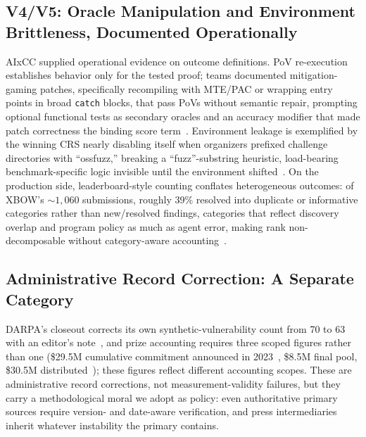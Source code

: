 \documentclass[conference,compsoc]{IEEEtran}
\begin{document}
\subsection{V4/V5: Oracle Manipulation and Environment Brittleness, Documented Operationally}
AIxCC supplied operational evidence on outcome definitions. PoV re-execution establishes
behavior only for the tested proof; teams documented mitigation-gaming patches, specifically recompiling
with MTE/PAC or wrapping entry points in broad \texttt{catch} blocks, that pass PoVs without
semantic repair, prompting optional functional tests as secondary oracles and an accuracy
modifier that made patch correctness the binding score term~\cite{taafc2025}. Environment
leakage is exemplified by the winning CRS nearly disabling itself when organizers prefixed
challenge directories with ``ossfuzz,'' breaking a ``fuzz''-substring heuristic, load-bearing
benchmark-specific logic invisible until the environment shifted~\cite{taafc2025}. On the
production side, leaderboard-style counting conflates heterogeneous outcomes: of XBOW's
${\sim}1{,}060$ submissions, roughly 39\% resolved into duplicate or informative categories
rather than new/resolved findings, categories that reflect discovery overlap and program
policy as much as agent error, making rank non-decomposable without category-aware
accounting~\cite{xbowtop12025}.

\subsection{Administrative Record Correction: A Separate Category}
DARPA's closeout corrects its own synthetic-vulnerability count from 70 to 63 with an editor's
note~\cite{darparesults2025}, and prize accounting requires three scoped figures rather than
one (\$29.5M cumulative commitment announced in 2023~\cite{darpa2023aixcc}, \$8.5M final pool, \$30.5M
distributed~\cite{darpascoring2025,openssfaixcc2026}); these figures reflect different accounting scopes. These are administrative record
corrections, not measurement-validity failures, but they carry a methodological moral we adopt
as policy: even authoritative primary sources require version- and date-aware verification,
and press intermediaries inherit whatever instability the primary contains.
\end{document}
